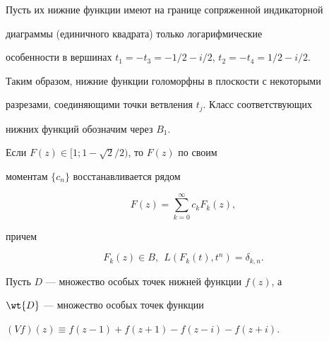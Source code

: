 Пусть их нижние функции имеют на границе сопряженной индикаторной 


диаграммы (единичного квадрата) только логарифмические 


особенности в вершинах $t_1=-t_3=-1/2-i/2$, $t_2=-t_4=1/2-i/2$.


Таким образом, нижние функции голоморфны в плоскости с некоторыми


разрезами, соединяющими точки ветвления $t_j$. Класс соответствующих


нижних функций обозначим через $B_1$.





\begin{thm}


Если $F(z)\in [1;1-\sqrt2/2)$, то $F(z)$ по своим


моментам $\{c_n\}$ восстанавливается рядом


\begin{equation}\label{3}


F(z)=\sum_{k=0}^\infty c_kF_k(z),


\end{equation}


причем 


\begin{equation}\label{4}


F_k(z)\in B,\ \ L(F_k(t),t^n)=\delta_{k,n}.


\end{equation}


\end{thm}





Пусть $D$ --- множество особых точек нижней функции $f(z)$, а 


$\wt{D}$ --- множество особых точек функции 


$(Vf)(z)\equiv f(z-1)+f(z+1)-f(z-i)-f(z+i)$.





